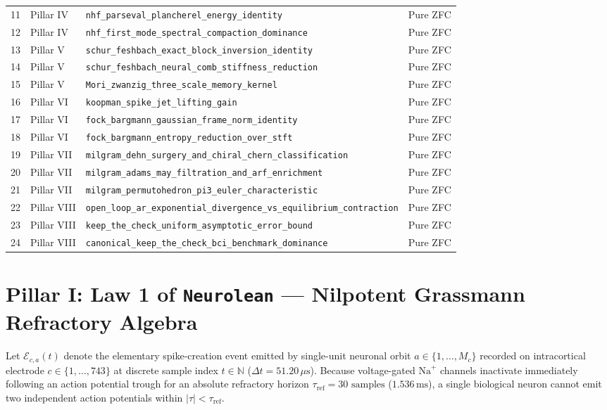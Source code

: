 \documentclass[11pt,letterpaper]{article}
\newcommand{\lean}[1]{\nolinkurl{#1}}
\theoremstyle{definition}
\begin{document}
\begin{footnotesize}
\begin{longtable}{@{}rl>{\raggedright\arraybackslash}p{3.95in}l@{}}
11 & Pillar IV & \lean{nhf_parseval_plancherel_energy_identity} & Pure ZFC \\
12 & Pillar IV & \lean{nhf_first_mode_spectral_compaction_dominance} & Pure ZFC \\
13 & Pillar V & \lean{schur_feshbach_exact_block_inversion_identity} & Pure ZFC \\
14 & Pillar V & \lean{schur_feshbach_neural_comb_stiffness_reduction} & Pure ZFC \\
15 & Pillar V & \lean{Mori_zwanzig_three_scale_memory_kernel} & Pure ZFC \\
16 & Pillar VI & \lean{koopman_spike_jet_lifting_gain} & Pure ZFC \\
17 & Pillar VI & \lean{fock_bargmann_gaussian_frame_norm_identity} & Pure ZFC \\
18 & Pillar VI & \lean{fock_bargmann_entropy_reduction_over_stft} & Pure ZFC \\
19 & Pillar VII & \lean{milgram_dehn_surgery_and_chiral_chern_classification} & Pure ZFC \\
20 & Pillar VII & \lean{milgram_adams_may_filtration_and_arf_enrichment} & Pure ZFC \\
21 & Pillar VII & \lean{milgram_permutohedron_pi3_euler_characteristic} & Pure ZFC \\
22 & Pillar VIII & \lean{open_loop_ar_exponential_divergence_vs_equilibrium_contraction} & Pure ZFC \\
23 & Pillar VIII & \lean{keep_the_check_uniform_asymptotic_error_bound} & Pure ZFC \\
24 & Pillar VIII & \lean{canonical_keep_the_check_bci_benchmark_dominance} & Pure ZFC \\
\end{longtable}
\end{footnotesize}

\section[Pillar I: Law 1 of Neurolean --- Nilpotent Grassmann Refractory Algebra]{Pillar I: Law 1 of \texttt{Neurolean} --- Nilpotent Grassmann Refractory Algebra}

Let $\mathcal{E}_{c,a}(t)$ denote the elementary spike-creation event emitted by single-unit neuronal orbit $a \in \{1,\dots,M_c\}$ recorded on intracortical electrode $c \in \{1,\dots,743\}$ at discrete sample index $t \in \mathbb{N}$ ($\Delta t = 51.20\,\mu\text{s}$). Because voltage-gated $\mathrm{Na}^+$ channels inactivate immediately following an action potential trough for an absolute refractory horizon $\tau_{\mathrm{ref}} = 30\text{ samples}$ ($1.536\,\text{ms}$), a single biological neuron cannot emit two independent action potentials within $|\tau| < \tau_{\mathrm{ref}}$.
\end{document}
